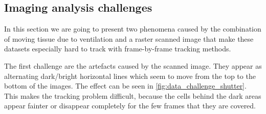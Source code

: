     	
	\subsection{Imaging analysis challenges \statusseconddraft}
	\label{sec:data_challenges}
	In this section we are going to present two phenomena caused by the combination of moving tissue due to ventilation and a raster scanned image that make these datasets especially hard to track with frame-by-frame tracking methods.
	
	The first challenge are the artefacts caused by the scanned image. They appear as alternating dark/bright horizontal lines which seem to move from the top to the bottom of the images. The effect can be seen in \cref{fig:data_challenge_shutter}. This makes the tracking problem difficult, because the cells behind the dark areas appear fainter or disappear completely for the few frames that they are covered.
		
